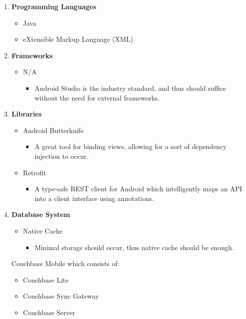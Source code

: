 \documentclass{article}
\begin{document}
			\begin{enumerate}
				 \item \textbf{Programming Languages}
				\begin{itemize}
					\item Java
					\item eXtensible Markup Language (XML)
				\end{itemize}
			\item \textbf{Frameworks}
				\begin{itemize}
					\item N/A
					\begin{itemize}
						\item Android Studio is the industry standard, and thus should suffice without the need for external frameworks.
					\end{itemize}
				\end{itemize}
			\item \textbf{Libraries}
				\begin{itemize}
					\item Android Butterknife
					\begin{itemize}
						\item A great tool for binding views, allowing for a sort of dependency injection to occur.
					\end{itemize}
					\item Retrofit
					\begin{itemize}
						\item A type-safe REST client for Android which intelligently maps an API into a client interface using annotations.
					\end{itemize}
				\end{itemize}
			\item \textbf{Database System}
			\begin{itemize}
				\item Native Cache
				\begin{itemize}
					\item Minimal storage should occur, thus native cache should be enough.
				\end{itemize}
			\end{itemize}
			Couchbase Mobile which consists of:
				\begin{itemize}
	 				\item Couchbase Lite
					\item Couchbase Sync Gateway
					\item Couchbase Server
					\begin{itemize}

\end{itemize}
\end{itemize}
\end{enumerate}
\end{document}
